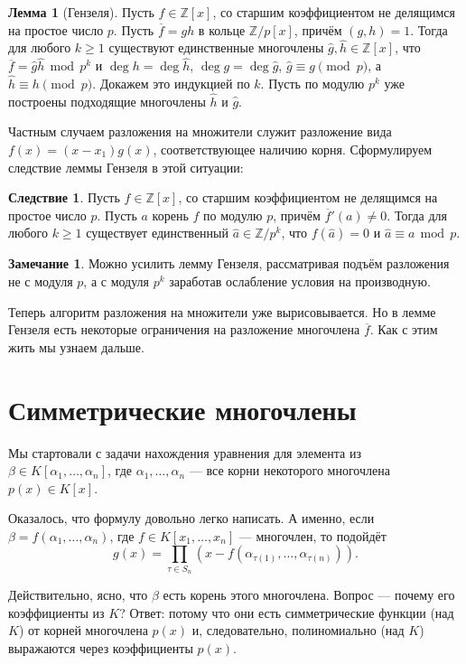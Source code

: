 \documentclass[10pt,a4paper,oneside]{book}
\theoremstyle{definition}
\newtheorem*{rem}{Замечание}
\newtheorem{lem}{{\color{green!50!black} Лемма}}
\newtheorem{cor}{Следствие}
\renewcommand{\mod}{\,\operatorname{mod}\,}
\newcommand{\mb}[1]{\mathbb{#1}}
\newcommand{\ovl}{\overline}
\def\lm{\begin{lem}}
\def\elm{\end{lem}}
\def\crl{\begin{cor}}
\def\ecrl{\end{cor}}
\def\rm{\begin{rem}}
\def\erm{\end{rem}}
\begin{document}
\lm[Гензеля] Пусть $f \in \mb Z[x]$, со старшим коэффициентом не делящимся на простое число $p$. Пусть $\ovl{f}=gh$ в кольце $\mb Z/p[x]$, причём $(g,h)=1$. Тогда  для любого $k\geq 1$ существуют единственные многочлены $\hat{g}, \hat{h} \in \mb Z[x]$, что $\ovl{f}=\hat{g} \hat{h} \mod p^k$  и $\deg h= \deg \hat{h}$, $\deg g= \deg \hat{g}$, $\hat{g}\equiv g \pmod{p}$, а $\hat{h}\equiv h \pmod{p}$.
\proof Докажем это индукцией по $k$. Пусть по модулю $p^{k}$ уже построены подходящие многочлены $\hat{h}$ и $\hat{g}$.
\endproof
\elm


Частным случаем разложения на множители служит разложение вида $f(x)=(x-x_1)g(x)$, соответствующее наличию корня. Сформулируем следствие леммы Гензеля в этой ситуации:


\crl Пусть $f \in \mb Z[x]$, со старшим коэффициентом не делящимся на простое число $p$. Пусть $a$ корень $f$ по модулю $p$, причём $\ovl{f}'(a)\neq 0$. Тогда  для любого $k\geq 1$ существует единственный $ \hat{a}\in \mb Z/p^k$,  что $f(\hat{a})=0$ и $\hat{a} \equiv a \mod p$.
\proof
\endproof
\ecrl

\rm Можно усилить лемму Гензеля, рассматривая подъём разложения не с модуля $p$, а с модуля $p^k$ заработав ослабление условия на производную.
\erm


Теперь алгоритм разложения на множители уже вырисовывается. Но в лемме Гензеля есть некоторые ограничения на разложение многочлена $\ovl{f}$. Как с этим жить мы узнаем дальше.




   









\section{Симметрические многочлены}

Мы стартовали с задачи нахождения уравнения для элемента из $\beta \in K[\alpha_1, \dots, \alpha_n]$, где $\alpha_1,\dots, \alpha_n$ --- все корни некоторого многочлена $p(x)\in K[x]$. 

Оказалось, что формулу довольно легко написать. А именно, если $\beta=f(\alpha_1, \dots, \alpha_n)$, где $f\in K[x_1,\dots,x_n]$ --- многочлен, то подойдёт
 $$g(x)=\prod_{\tau \in S_n} (x - f(\alpha_{\tau(1)}, \dots, \alpha_{\tau(n)})).$$

Действительно, ясно, что $\beta$ есть корень этого многочлена. Вопрос --- почему его коэффициенты из $K$? Ответ: потому что они есть симметрические функции (над $K$) от корней многочлена $p(x)$ и, следовательно, полиномиально (над $K$) выражаются через коэффициенты $p(x)$. 
\end{document}
